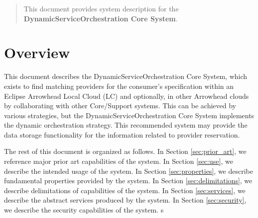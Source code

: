\documentclass[a4paper]{arrowhead}
\begin{document}
\ArrowheadDate{\today}
\ArrowheadSetup

\begin{center}
  \vspace*{1cm}
  \huge{\arrowtitle}

  \vspace*{0.2cm}
  \LARGE{\arrowtype}
  \vspace*{1cm}

  \vspace*{\fill}


  \vspace*{1cm}
  \vspace*{\fill}

  \begin{abstract}
    This document provides system description for the \textbf{DynamicServiceOrchestration Core System}.
  \end{abstract}

  \vspace*{1cm}

 \end{center}

\newpage

\tableofcontents
\newpage

\section{Overview}
\label{sec:overview}
\color{black}
This document describes the DynamicServiceOrchestration Core System, which exists to find matching providers for the consumer's specification within an Eclipse Arrowhead Local Cloud (LC) and optionally, in other Arrowhead clouds by collaborating with other Core/Support systems. This can be achieved by various strategies, but the DynamicServiceOrchestration Core System implements the dynamic orchestration strategy. This recommended system may provide the data storage functionality for the information related to provider reservation.

The rest of this document is organized as follows.
In Section \ref{sec:prior_art}, we reference major prior art capabilities
of the system.
In Section \ref{sec:use}, we describe the intended usage of the system.
In Section \ref{sec:properties}, we describe fundamental properties
provided by the system.
In Section \ref{sec:delimitations}, we describe delimitations of capabilities
of the system.
In Section \ref{sec:services}, we describe the abstract services produced by the system.
In Section \ref{sec:security}, we describe the security capabilities
of the system.
s
\end{document}
